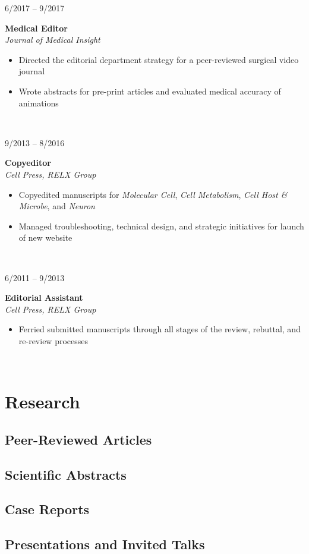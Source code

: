 \documentclass{article}
\newcommand\colleft{.20}
\newcommand\colright{.75}
\newcommand{\entryfour}[4]
	{
		\begin{minipage}[t]{\colleft\textwidth}
		\hfill \textsc{#1}
		\end{minipage}
		\hfill\vline\hfill
		\begin{minipage}[t]{\colright\textwidth}
		{\bf#2}\\
		\textit{#3}
		\footnotesize{#4}
		\end{minipage}\\
		\entryvspace
	}%
\newcommand{\entryvspace}{\vspace{0.5em}}
\begin{document}
		\entryfour{6/2017 -- 9/2017}{Medical Editor}{Journal of Medical Insight}{%
		\begin{itemize}
			\item Directed the editorial department strategy for a peer-reviewed surgical video journal
			\item Wrote abstracts for pre-print articles and evaluated medical accuracy of animations
		\end{itemize}
		}
		
		\entryfour{9/2013 -- 8/2016}{Copyeditor}{Cell Press, RELX Group}{%
			\begin{itemize}
				\item Copyedited manuscripts for \emph{Molecular Cell}, \emph{Cell Metabolism}, \emph{Cell Host \& Microbe}, and \emph{Neuron}
				\item Managed troubleshooting, technical design, and strategic initiatives for launch of new website 
			\end{itemize}
		}
		
		\entryfour{6/2011 -- 9/2013}{Editorial Assistant}{Cell Press, RELX Group}{%
			\begin{itemize}
				\item Ferried submitted manuscripts through all stages of the review, rebuttal, and re-review processes
			\end{itemize}
		}

\section*{Research}
	\nocite{*}
	\subsection*{Peer-Reviewed Articles}
		\printbibliography[keyword=article, heading=none]
	\subsection*{Scientific Abstracts}
		\printbibliography[keyword=abstract, heading=none,resetnumbers]	
	\subsection*{Case Reports}
		\printbibliography[keyword=caseRep, heading=none,resetnumbers]
  \subsection*{Presentations and Invited Talks}
	  \printbibliography[keyword=presentation, heading=none, resetnumbers]
\end{document}
